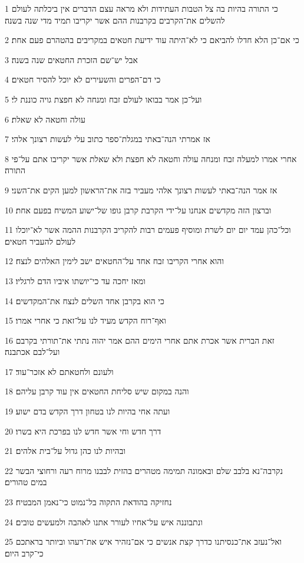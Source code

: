 \par 1 כי התורה בהיות בה צל הטבות העתידות ולא מראה עצם הדברים אין ביכלתה לעולם להשלים את־הקרבים בקרבנות ההם אשר יקריבו תמיד מדי שנה בשנה׃
\par 2 כי אם־כן הלא חדלו להביאם כי לא־היתה עוד ידיעת חטאים במקריבים בהטהרם פעם אחת׃
\par 3 אבל יש־שם הזכרת החטאים שנה בשנה׃
\par 4 כי דם־הפרים והשעירים לא יוכל להסיר חטאים׃
\par 5 ועל־כן אמר בבואו לעולם זבח ומנחה לא חפצת גויה כוננת לי׃
\par 6 עולה וחטאה לא שאלת׃
\par 7 אז אמרתי הנה־באתי במגלת־ספר כתוב עלי לעשות רצונך אלהי׃
\par 8 אחרי אמרו למעלה זבח ומנחה עולה וחטאה לא חפצת ולא שאלת אשר יקריבו אתם על־פי התורה׃
\par 9 אז אמר הנה־באתי לעשות רצונך אלהי מעביר בזה את־הראשון למען הקים את־השני׃
\par 10 וברצון הזה מקדשים אנחנו על־ידי הקרבת קרבן גופו של־ישוע המשיח בפעם אחת׃
\par 11 וכל־כהן עמד יום יום לשרת ומוסיף פעמים רבות להקריב הקרבנות ההמה אשר לא־יוכלו לעולם להעביר חטאים׃
\par 12 והוא אחרי הקריבו זבח אחד על־החטאים ישב לימין האלהים לנצח׃
\par 13 ומאז יחכה עד כי־יושתו איביו הדם לרגליו׃
\par 14 כי הוא בקרבן אחד השלים לנצח את־המקדשים׃
\par 15 ואף־רוח הקדש מעיד לנו על־זאת כי אחרי אמרו׃
\par 16 זאת הברית אשר אכרת אתם אחרי הימים ההם אמר יהוה נתתי את־תורתי בקרבם ועל־לבם אכתבנה׃
\par 17 ולעונם ולחטאתם לא אזכר־עוד׃
\par 18 והנה במקום שיש סליחת החטאים אין עוד קרבן עליהם׃
\par 19 ועתה אחי בהיות לנו בטחון דרך הקדש בדם ישוע׃
\par 20 דרך חדש וחי אשר חדש לנו בפרכת היא בשרו׃
\par 21 ובהיות לנו כהן גדול על־בית אלהים׃
\par 22 נקרבה־נא בלבב שלם ובאמונה תמימה מטהרים בהזית לבבנו מרוח רעה ורחוצי הבשר במים טהורים׃
\par 23 נחזיקה בהודאת התקוה בל־נמוט כי־נאמן המבטיח׃
\par 24 ונתבוננה איש על־אחיו לעורר אתנו לאהבה ולמעשים טובים׃
\par 25 ואל־נעזב את־כנסיתנו כדרך קצת אנשים כי אם־נזהיר איש את־רעהו וביותר בראתכם כי־קרב היום׃
